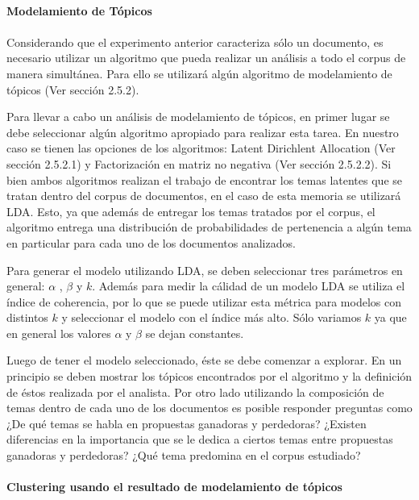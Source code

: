     \paragraph{Modelamiento de Tópicos}
    \paragraph*{}
    Considerando que el experimento anterior caracteriza sólo un documento, es necesario utilizar un algoritmo que pueda realizar un análisis a todo el corpus de manera simultánea. Para ello se utilizará algún algoritmo de modelamiento de tópicos (Ver sección 2.5.2).
    
    Para llevar a cabo un análisis de modelamiento de tópicos, en primer lugar se debe seleccionar algún algoritmo apropiado para realizar esta tarea. En nuestro caso se tienen las opciones de los algoritmos: Latent Dirichlent Allocation (Ver sección 2.5.2.1) y Factorización en matriz no negativa (Ver sección 2.5.2.2). Si bien ambos algoritmos realizan el trabajo de encontrar los temas latentes que se tratan dentro del corpus de documentos, en el caso de esta memoria se utilizará LDA. Esto, ya que además de entregar los temas tratados por el corpus, el algoritmo entrega una distribución de probabilidades de pertenencia a algún tema en particular para cada uno de los documentos analizados.
    
    Para generar el modelo utilizando LDA, se deben seleccionar tres parámetros en general: $\alpha$ , $\beta$ y $k$. Además para medir la cálidad de un modelo LDA se utiliza el índice de coherencia, por lo que se puede utilizar esta métrica para modelos con distintos $k$ y seleccionar el modelo con el índice más alto. Sólo variamos $k$ ya que en general los valores $\alpha$ y $\beta$ se dejan constantes. 
    
    Luego de tener el modelo seleccionado, éste se debe comenzar a explorar. En un principio se deben mostrar los tópicos encontrados por el algoritmo y la definición de éstos realizada por el analista. Por otro lado utilizando la composición de temas dentro de cada uno de los documentos es posible responder preguntas como ¿De qué temas se habla en propuestas ganadoras y perdedoras? ¿Existen diferencias en la importancia que se le dedica a ciertos temas entre propuestas ganadoras y perdedoras? ¿Qué tema predomina en el corpus estudiado?
    
    \paragraph{Clustering usando el resultado de modelamiento de tópicos}
